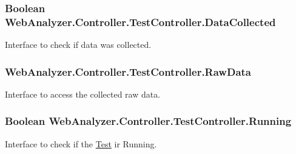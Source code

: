 \subsubsection[{Data\+Collected}]{\setlength{\rightskip}{0pt plus 5cm}Boolean Web\+Analyzer.\+Controller.\+Test\+Controller.\+Data\+Collected\hspace{0.3cm}{\ttfamily [get]}}\label{class_web_analyzer_1_1_controller_1_1_test_controller_a741cf98b95422a4a307bf8834db147b3}


Interface to check if data was collected. 

\hypertarget{class_web_analyzer_1_1_controller_1_1_test_controller_a3ec6bf7552cde054fdffaa8a1a6cf981}{}
\subsubsection[{Raw\+Data}]{ Web\+Analyzer.\+Controller.\+Test\+Controller.\+Raw\+Data\hspace{0.3cm}{\ttfamily [get]}}\label{class_web_analyzer_1_1_controller_1_1_test_controller_a3ec6bf7552cde054fdffaa8a1a6cf981}


Interface to access the collected raw data. 

\hypertarget{class_web_analyzer_1_1_controller_1_1_test_controller_a4020785450ade4a26f603d667ce633d6}{}
\subsubsection[{Running}]{\setlength{\rightskip}{0pt plus 5cm}Boolean Web\+Analyzer.\+Controller.\+Test\+Controller.\+Running\hspace{0.3cm}{\ttfamily [get]}}\label{class_web_analyzer_1_1_controller_1_1_test_controller_a4020785450ade4a26f603d667ce633d6}


Interface to check if the \hyperlink{namespace_web_analyzer_1_1_test}{Test} ir Running. 

\hypertarget{class_web_analyzer_1_1_controller_1_1_test_controller_afcf9572f80c31e6d9aca33f96e3aaa4f}{}
